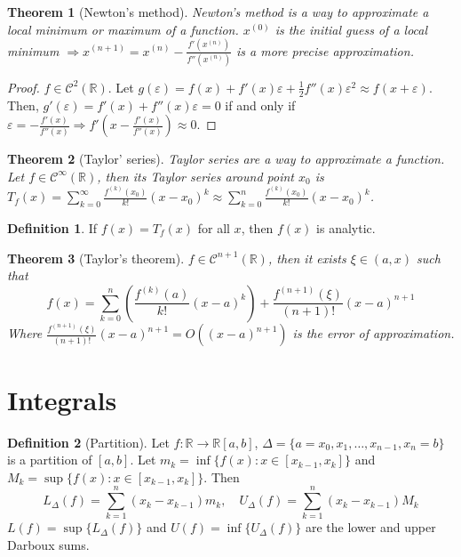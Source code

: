 \documentclass{article}
\newcommand{\DS}{\displaystyle}
\newcommand{\Ar}{\Rightarrow}
\newcommand{\fOnR}[1]{#1 : \mathbb{R} \rightarrow \mathbb{R}}
\newcommand{\intcc}[1]{\left[#1\right]}
\newcommand{\intoo}[1]{\left(#1\right)}
\theoremstyle{definition}
\newtheorem{definition}{Definition}[section]
\theoremstyle{definition}
\theoremstyle{plain}
\newtheorem{theorem}{Theorem}[section]
\theoremstyle{plain}
\theoremstyle{plain}
\theoremstyle{plain}
\theoremstyle{definition}
\theoremstyle{remark}
\theoremstyle{remark}
\theoremstyle{remark}
\theoremstyle{remark}
\newcommand{\R}{\mathbb{R}}
\newcommand{\C}{\mathcal{C}}
\newcommand{\sumn}{\sum_{k=1}^n}
\newcommand{\E}{\varepsilon}
\begin{document}
\begin{theorem}[Newton's method]
  Newton's method is a way to approximate a local minimum or maximum of a function. $x^{(0)}$ is the initial guess of a local minimum $\Ar x^{(n+1)} = x^{(n)} - \frac{f'(x^{(n)})}{f''(x^{(n)})}$ is a more precise approximation.
\end{theorem}

\begin{proof}
  $f \in \C^2(\R)$. Let $g(\E) = f(x) + f'(x)\E + \frac{1}{2}f''(x)\E^2 \approx f(x+\E)$. Then, $g'(\E) = f'(x) + f''(x)\E = 0$ if and only if $\E = -\frac{f'(x)}{f''(x)} \Ar f'(x - \frac{f'(x)}{f''(x)}) \approx 0$.
\end{proof}



\begin{theorem}[Taylor' series]
  Taylor series are a way to approximate a function. Let $f \in \C^\infty(\R)$, then its Taylor series around point $x_0$ is $\DS T_f(x) = \sum_{k=0}^\infty \frac{f^{(k)}(x_0)}{k!}(x-x_0)^k \approx \sum_{k=0}^n \frac{f^{(k)}(x_0)}{k!}(x-x_0)^k$.
\end{theorem}



\begin{definition}
  If $f(x) = T_f(x)$ for all $x$, then $f(x)$ is analytic.
\end{definition}



\begin{theorem}[Taylor's theorem]
  $f \in \C^{n+1}(\R)$, then it exists $\xi \in \intoo{a,x}$ such that
  \[
  f(x) =
  \sum_{k=0}^n \left( \frac{f^{(k)}(a)}{k!}(x-a)^k \right) +
  \frac{f^{(n+1)}(\xi)}{(n+1)!}(x-a)^{n+1}
  \]
  Where $\frac{f^{(n+1)}(\xi)}{(n+1)!}(x-a)^{n+1} = O((x-a)^{n+1})$ is the error of approximation.
\end{theorem}


\section{Integrals}


\begin{definition}[Partition]
  Let $\fOnR{f}{\intcc{a,b}}$, $\Delta = \{ a = x_0, x_1, \hdots, x_{n-1}, x_n = b \}$ is a partition of $\intcc{a,b}$. Let $m_k = \inf \{ f(x) : x \in \intcc{x_{k-1},x_k} \}$ and $M_k = \sup \{ f(x) : x \in \intcc{x_{k-1},x_k} \}$. Then
  \[
  L_\Delta(f) = \sumn (x_k - x_{k-1})m_k, \quad
  U_\Delta(f) = \sumn (x_k - x_{k-1})M_k
  \]
  $L(f) = \sup \{ L_\Delta(f) \}$ and $U(f) = \inf \{ U_\Delta(f) \}$ are the lower and upper Darboux sums.
\end{definition}
\end{document}
